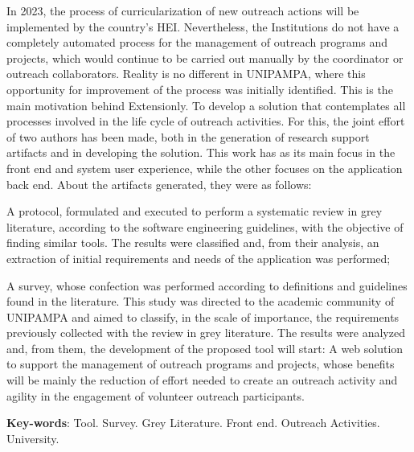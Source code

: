 \begin{resumo}[Abstract]
  In 2023, the process of curricularization of new outreach actions will be implemented by the country's \ac{HEI}. Nevertheless, the Institutions do not have a completely automated process for the management of outreach programs and projects, which would continue to be carried out manually by the coordinator or outreach collaborators. Reality is no different in \acs{UNIPAMPA}, where this opportunity for improvement of the process was initially identified. This is the main motivation behind Extensionly. To develop a solution that contemplates all processes involved in the life cycle of outreach activities. For this, the joint effort of two authors has been made, both in the generation of research support artifacts and in developing the solution. This work has as its main focus in the front end and system user experience, while the other focuses on the application back end. About the artifacts generated, they were as follows:
  \begin{inparaenum}[(a)]
    \item A protocol, formulated and executed to perform a systematic review in grey literature, according to the software engineering guidelines, with the objective of finding similar tools. The results were classified and, from their analysis, an extraction of initial requirements and needs of the application was performed;
    \item A survey, whose confection was performed according to definitions and guidelines found in the literature. This study was directed to the academic community of \acs{UNIPAMPA} and aimed to classify, in the scale of importance, the requirements previously collected with the review in grey literature. The results were analyzed and, from them, the development of the proposed tool will start: A web solution to support the management of outreach programs and projects, whose benefits will be mainly the reduction of effort needed to create an outreach activity and agility in the engagement of volunteer outreach participants.
  \end{inparaenum}

  \vspace{\onelineskip}

  \noindent
  \textbf{Key-words}: Tool. Survey. Grey Literature. Front end. Outreach Activities. University.
\end{resumo}
